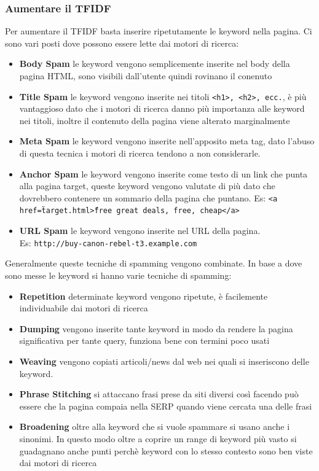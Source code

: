 \subsubsection{Aumentare il TFIDF}
Per aumentare il TFIDF basta inserire ripetutamente le keyword nella pagina.
Ci sono vari posti dove possono essere lette dai motori di ricerca:
\begin{itemize}
\item \textbf{Body Spam} le keyword vengono semplicemente inserite nel body della pagina HTML, sono visibili dall'utente quindi rovinano il conenuto
\item \textbf{Title Spam} le keyword vengono inserite nei titoli \texttt{<h1>, <h2>, ecc.}, è più vantaggioso dato che i motori di ricerca danno più importanza alle keyword nei titoli, inoltre il contenuto della pagina viene alterato marginalmente
\item \textbf{Meta Spam} le keyword vengono inserite nell'apposito meta tag, dato l'abuso di questa tecnica i motori di ricerca tendono a non considerarle.
\item \textbf{Anchor Spam} le keyword vengono inserite come testo di un link che punta alla pagina target, queste keyword vengono valutate di più dato che dovrebbero contenere un sommario della pagina che puntano. Es: \texttt{<a href=\"target.html\">free great deals, free, cheap</a>}
\item \textbf{URL Spam} le keyword vengono inserite nel URL della pagina. \\ Es: \texttt{http://buy-canon-rebel-t3.example.com} 
\end{itemize}
Generalmente queste tecniche di spamming vengono combinate.
In base a dove sono messe le keyword si hanno varie tecniche di spamming:
\begin{itemize}
\item \textbf{Repetition} determinate keyword vengono ripetute, è facilemente individuabile dai motori di ricerca
\item \textbf{Dumping} vengono inserite tante keyword in modo da rendere la pagina significativa per tante query, funziona bene con termini poco usati
\item \textbf{Weaving} vengono copiati articoli/news dal web nei quali si inseriscono delle keyword.
\item \textbf{Phrase Stitching} si attaccano frasi prese da siti diversi così facendo può essere che la pagina compaia nella SERP quando viene cercata una delle frasi
\item \textbf{Broadening} oltre alla keyword che si vuole spammare si usano anche i sinonimi. In questo modo oltre a coprire un range di keyword più vasto si guadagnano anche punti perchè keyword con lo stesso contesto sono ben viste dai motori di ricerca
\end{itemize}
